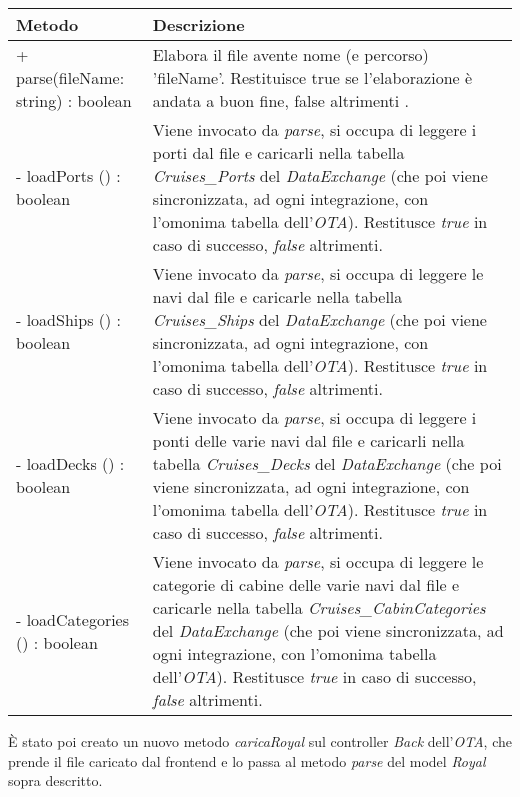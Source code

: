\begin{center}
	\def\arraystretch{1.5}
	\begin{longtable}{ >{\raggedright}p{5.5cm} p{6.8cm}} 
		\hline
		\textbf{Metodo} & \textbf{Descrizione} \\ \hline
		+ parse(fileName: string) : boolean & Elabora il file avente nome (e percorso) 'fileName'. Restituisce true se l'elaborazione è andata a buon fine, false altrimenti .\\
		\hline
		- loadPorts () : boolean & Viene invocato da \textit{parse}, si occupa di leggere i porti dal file e caricarli nella tabella \textit{Cruises\_Ports} del \textit{DataExchange} (che poi viene sincronizzata, ad ogni integrazione, con l'omonima tabella dell'\textit{OTA}). Restitusce \textit{true} in caso di successo, \textit{false} altrimenti.\\
		\hline
		- loadShips () : boolean & Viene invocato da \textit{parse}, si occupa di leggere le navi dal file e caricarle nella tabella \textit{Cruises\_Ships} del \textit{DataExchange} (che poi viene sincronizzata, ad ogni integrazione, con l'omonima tabella dell'\textit{OTA}). Restitusce \textit{true} in caso di successo, \textit{false} altrimenti.\\
		\hline
		- loadDecks () : boolean & Viene invocato da \textit{parse}, si occupa di leggere i ponti delle varie navi dal file e caricarli nella tabella \textit{Cruises\_Decks} del \textit{DataExchange} (che poi viene sincronizzata, ad ogni integrazione, con l'omonima tabella dell'\textit{OTA}). Restitusce \textit{true} in caso di successo, \textit{false} altrimenti.\\
		\hline
		- loadCategories () : boolean & Viene invocato da \textit{parse}, si occupa di leggere le categorie di cabine delle varie navi dal file e caricarle nella tabella \textit{Cruises\_CabinCategories} del \textit{DataExchange} (che poi viene sincronizzata, ad ogni integrazione, con l'omonima tabella dell'\textit{OTA}). Restitusce \textit{true} in caso di successo, \textit{false} altrimenti.\\
		\hline
	\end{longtable}
\end{center}
È stato poi creato un nuovo metodo \textit{caricaRoyal} sul controller \textit{Back} dell'\textit{OTA}, che prende il file caricato dal frontend e lo passa al metodo \textit{parse} del model \textit{Royal} sopra descritto.

